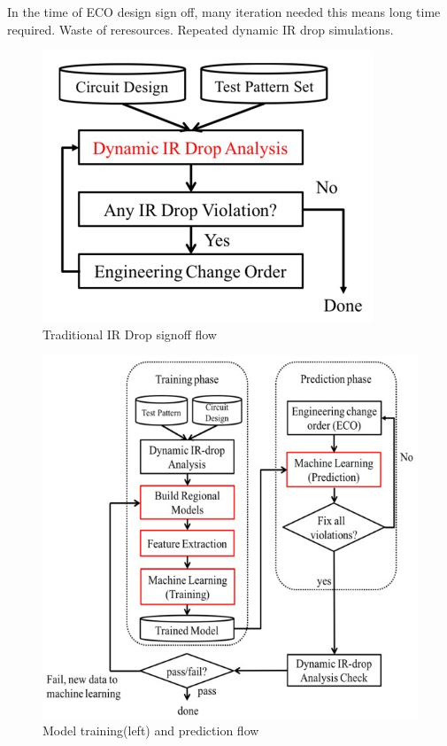 \documentclass[a4paper]{article}
\begin{document}
In the time of ECO design sign off, many iteration needed
this means long time required.
Waste of reresources.
Repeated dynamic IR drop simulations.

\begin{figure}[htbp]
\centering
\includegraphics[width=.9\linewidth]{./img/p0.jpg}
\caption{\label{fig:org3af54b6}Traditional IR Drop signoff flow}
\end{figure}

\begin{figure}[htbp]
\centering
\includegraphics[width=.9\linewidth]{./img/p2.jpg}
\caption{\label{fig:org47c2be0}Model training(left) and prediction flow}
\end{figure}
\end{document}
